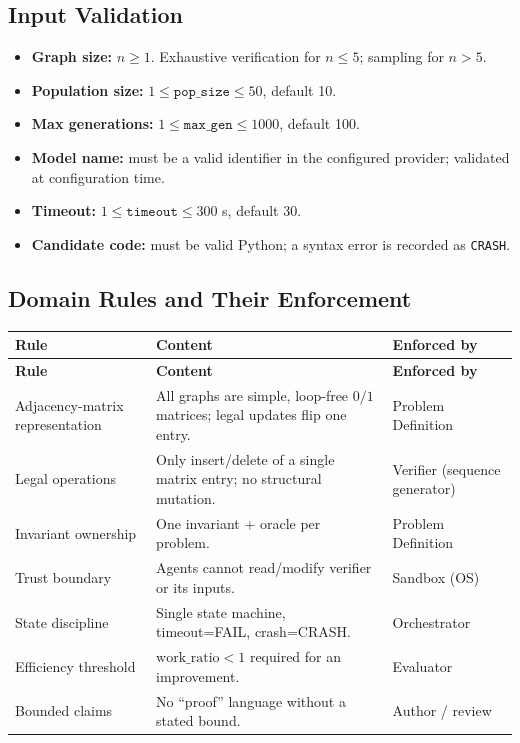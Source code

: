 \documentclass[12pt,a4paper]{article}
\begin{document}
\subsection{Input Validation}

\begin{itemize}[noitemsep]
  \item \textbf{Graph size:} $n \geq 1$. Exhaustive verification for $n \le 5$; sampling for $n > 5$.
  \item \textbf{Population size:} $1 \le \texttt{pop\_size} \le 50$, default 10.
  \item \textbf{Max generations:} $1 \le \texttt{max\_gen} \le 1000$, default 100.
  \item \textbf{Model name:} must be a valid identifier in the configured provider; validated at configuration time.
  \item \textbf{Timeout:} $1 \le \texttt{timeout} \le 300$ s, default 30.
  \item \textbf{Candidate code:} must be valid Python; a syntax error is recorded as \texttt{CRASH}.
\end{itemize}

\subsection{Domain Rules and Their Enforcement}

\begin{longtable}{|p{4.5cm}|p{5.5cm}|p{4.5cm}|}
\hline
\textbf{Rule} & \textbf{Content} & \textbf{Enforced by} \\
\hline
\endfirsthead
\hline
\textbf{Rule} & \textbf{Content} & \textbf{Enforced by} \\
\hline
\endhead
\hline
\endfoot

Adjacency-matrix representation & All graphs are simple, loop-free $0/1$ matrices; legal updates flip one entry. & Problem Definition \\
\hline
Legal operations & Only insert/delete of a single matrix entry; no structural mutation. & Verifier (sequence generator) \\
\hline
Invariant ownership & One invariant + oracle per problem. & Problem Definition \\
\hline
Trust boundary & Agents cannot read/modify verifier or its inputs. & Sandbox (OS) \\
\hline
State discipline & Single state machine, timeout=FAIL, crash=CRASH. & Orchestrator \\
\hline
Efficiency threshold & $\text{work\_ratio} < 1$ required for an improvement. & Evaluator \\
\hline
Bounded claims & No ``proof'' language without a stated bound. & Author / review \\
\hline
\end{longtable}
\end{document}
